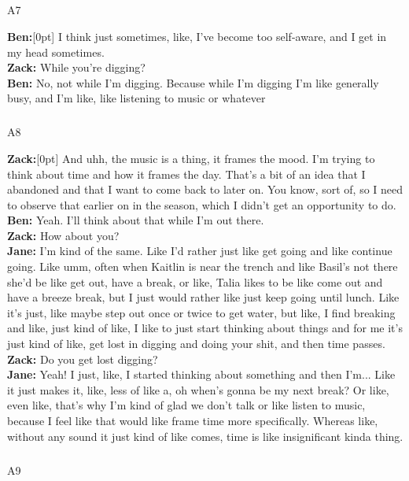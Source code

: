 \documentclass[
]{article}
\makeatletter
\let\oldsubparagraph\subparagraph
\renewcommand{\subparagraph}{
    \@ifstar
      \xxxSubParagraphStar
      \xxxSubParagraphNoStar
  }
\newcommand{\xxxSubParagraphStar}[1]{\oldsubparagraph*{#1}\mbox{}}
\newcommand{\xxxSubParagraphNoStar}[1]{\oldsubparagraph{#1}\mbox{}}
\newcommand{\paragraphnumber}[1]{\marginnote{\color{lightgray}\tiny{#1}}[0pt]}
\makeatother
\begin{document}
\subparagraph{A7}\label{sec-A7}

\textbf{Ben:}\paragraphnumber{[58]} I think just sometimes, like, I've
become too self-aware, and I get in my head sometimes.\\
\textbf{Zack:} While you're digging?\\
\textbf{Ben:} No, not while I'm digging. Because while I'm digging I'm
like generally busy, and I'm like, like listening to music or whatever

\subparagraph{A8}\label{sec-A8}

\textbf{Zack:}\paragraphnumber{[59]} And uhh, the music is a thing, it
frames the mood. I'm trying to think about time and how it frames the
day. That's a bit of an idea that I abandoned and that I want to come
back to later on. You know, sort of, so I need to observe that earlier
on in the season, which I didn't get an opportunity to do.\\
\textbf{Ben:} Yeah. I'll think about that while I'm out there.\\
\textbf{Zack:} How about you?\\
\textbf{Jane:} I'm kind of the same. Like I'd rather just like get going
and like continue going. Like umm, often when Kaitlin is near the trench
and like Basil's not there she'd be like get out, have a break, or like,
Talia likes to be like come out and have a breeze break, but I just
would rather like just keep going until lunch. Like it's just, like
maybe step out once or twice to get water, but like, I find breaking and
like, just kind of like, I like to just start thinking about things and
for me it's just kind of like, get lost in digging and doing your shit,
and then time passes.\\
\textbf{Zack:} Do you get lost digging?\\
\textbf{Jane:} Yeah! I just, like, I started thinking about something
and then I'm... Like it just makes it, like, less of like a, oh when's
gonna be my next break? Or like, even like, that's why I'm kind of glad
we don't talk or like listen to music, because I feel like that would
like frame time more specifically. Whereas like, without any sound it
just kind of like comes, time is like insignificant kinda thing.

\subparagraph{A9}\label{sec-A9}
\end{document}
